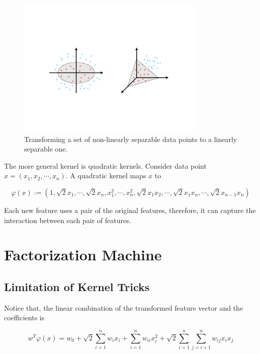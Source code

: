         \begin{figure}[!htp]
            \centering
            \includegraphics[width=0.8\textwidth]{img/kernel-tricks.pdf}
            \caption{Transforming a set of non-linearly separable data points to a linearly separable one.}
            \label{fig:kernel-tricks}
        \end{figure}

        The more general kernel is quadratic kernels.
        Consider data point $x = (x_1, x_2, \cdots, x_n)$.
        A quadratic kernel maps $x$ to 

        \[
        \varphi(x) := (1, \sqrt{2}x_1, \cdots, \sqrt{2}x_n, x_1^2, \cdots, x_n^2,
          \sqrt{2}x_1x_2, \cdots, \sqrt{2}x_1x_n, \cdots, \sqrt{2}x_{n-1}x_n)
        \]

        Each new feature uses a pair of the original features,
        therefore, it can capture the interaction between each pair of features.

\section{Factorization Machine}

    \subsection{Limitation of Kernel Tricks}

        Notice that, the linear combination of the transformed feature vector and the coefficients is

        \[
        w^T\varphi(x) = w_0 + \sqrt{2}\sum_{i=1}^n w_ix_i
        + \sum_{i=1}^n w_{ii}x_i^2 + \sqrt{2}\sum_{i=1}^n\sum_{j=i+1}^n w_{ij}x_ix_j
        \]

